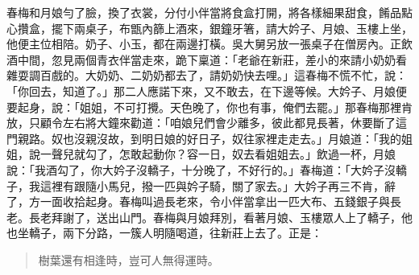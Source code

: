 春梅和月娘勻了臉，換了衣裳，分付小伴當將食盒打開，將各樣細果甜食，餚品點心攢盒，擺下兩桌子，布甑內篩上酒來，銀鐘牙箸，請大妗子、月娘、玉樓上坐，他便主位相陪。奶子、小玉，都在兩邊打橫。吳大舅另放一張桌子在僧房內。正飲酒中間，忽見兩個青衣伴當走來，跪下稟道：「老爺在新莊，差小的來請小奶奶看雜耍調百戲的。大奶奶、二奶奶都去了，請奶奶快去哩。」這春梅不慌不忙，說：「你回去，知道了。」那二人應諾下來，又不敢去，在下邊等候。大妗子、月娘便要起身，說：「姐姐，不可打攪。天色晚了，你也有事，俺們去罷。」那春梅那裡肯放，只顧令左右將大鐘來勸道：「咱娘兒們會少離多，彼此都見長著，休要斷了這門親路。奴也沒親沒故，到明日娘的好日子，奴往家裡走走去。」月娘道：「我的姐姐，說一聲兒就勾了，怎敢起動你？容一日，奴去看姐姐去。」飲過一杯，月娘說：「我酒勾了，你大妗子沒轎子，十分晚了，不好行的。」春梅道：「大妗子沒轎子，我這裡有跟隨小馬兒，撥一匹與妗子騎，關了家去。」大妗子再三不肯，辭了，方一面收拾起身。春梅叫過長老來，令小伴當拿出一匹大布、五錢銀子與長老。長老拜謝了，送出山門。春梅與月娘拜別，看著月娘、玉樓眾人上了轎子，他也坐轎子，兩下分路，一簇人明隨喝道，往新莊上去了。正是：
\begin{quote}
樹葉還有相逢時，豈可人無得運時。
\end{quote}
